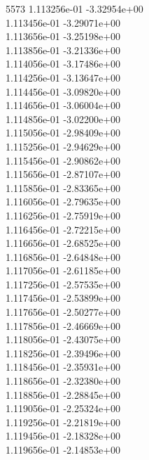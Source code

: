 5573	1.113256e-01	-3.32954e+00	\\ 	1.113456e-01	-3.29071e+00	\\ 	1.113656e-01	-3.25198e+00	\\ 	1.113856e-01	-3.21336e+00	\\ 	1.114056e-01	-3.17486e+00	\\ 	1.114256e-01	-3.13647e+00	\\ 	1.114456e-01	-3.09820e+00	\\ 	1.114656e-01	-3.06004e+00	\\ 	1.114856e-01	-3.02200e+00	\\ 	1.115056e-01	-2.98409e+00	\\ 	1.115256e-01	-2.94629e+00	\\ 	1.115456e-01	-2.90862e+00	\\ 	1.115656e-01	-2.87107e+00	\\ 	1.115856e-01	-2.83365e+00	\\ 	1.116056e-01	-2.79635e+00	\\ 	1.116256e-01	-2.75919e+00	\\ 	1.116456e-01	-2.72215e+00	\\ 	1.116656e-01	-2.68525e+00	\\ 	1.116856e-01	-2.64848e+00	\\ 	1.117056e-01	-2.61185e+00	\\ 	1.117256e-01	-2.57535e+00	\\ 	1.117456e-01	-2.53899e+00	\\ 	1.117656e-01	-2.50277e+00	\\ 	1.117856e-01	-2.46669e+00	\\ 	1.118056e-01	-2.43075e+00	\\ 	1.118256e-01	-2.39496e+00	\\ 	1.118456e-01	-2.35931e+00	\\ 	1.118656e-01	-2.32380e+00	\\ 	1.118856e-01	-2.28845e+00	\\ 	1.119056e-01	-2.25324e+00	\\ 	1.119256e-01	-2.21819e+00	\\ 	1.119456e-01	-2.18328e+00	\\ 	1.119656e-01	-2.14853e+00	\\ \hline
